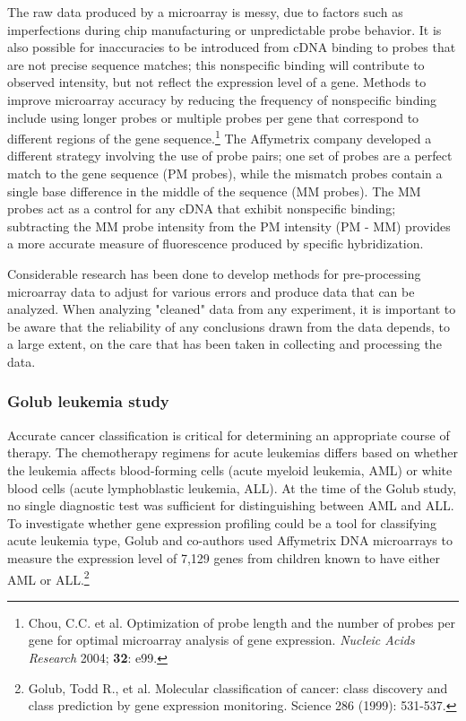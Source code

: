 The raw data produced by a microarray is messy, due to factors such as imperfections during chip manufacturing or unpredictable probe behavior. It is also possible for inaccuracies to be introduced from cDNA binding to probes that are not precise sequence matches; this nonspecific binding will contribute to observed intensity, but not reflect the expression level of a gene. Methods to improve microarray accuracy by reducing the frequency of nonspecific binding include using longer probes or multiple probes per gene that correspond to different regions of the gene sequence.\footnote{Chou, C.C. et al. Optimization of probe length and the number of probes per gene for optimal microarray analysis of gene expression. \textit{Nucleic Acids Research} 2004; \textbf{32}: e99.} The Affymetrix company developed a different strategy involving the use of probe pairs; one set of probes are a perfect match to the gene sequence (PM probes), while the mismatch probes contain a single base difference in the middle of the sequence (MM probes). The MM probes act as a control for any cDNA that exhibit nonspecific binding; subtracting the MM probe intensity from the PM intensity (PM - MM) provides a more accurate measure of fluorescence produced by specific hybridization.

Considerable research has been done to develop methods for pre-processing microarray data to adjust for various errors and produce data that can be analyzed. When analyzing "cleaned" data from any experiment, it is important to be aware that the reliability of any conclusions drawn from the data depends, to a large extent, on the care that has been taken in collecting and processing the data.

\subsubsection{Golub leukemia study}


Accurate cancer classification is critical for determining an appropriate course of therapy. The chemotherapy regimens for acute leukemias differs based on whether the leukemia affects blood-forming cells (acute myeloid leukemia, AML) or white blood cells (acute lymphoblastic leukemia, ALL). At the time of the Golub study, no single diagnostic test was sufficient for distinguishing between AML and ALL. To investigate whether gene expression profiling could be a tool for classifying acute leukemia type, Golub and co-authors used Affymetrix DNA microarrays to measure the expression level of 7,129 genes from children known to have either AML or ALL.\footnote{Golub, Todd R., et al. Molecular classification of cancer: class discovery and class prediction by gene expression monitoring. Science 286 (1999): 531-537.} 


